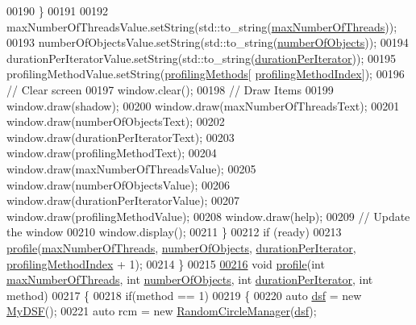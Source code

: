 \begin{DoxyCode}
00190         \}
00191         
00192         maxNumberOfThreadsValue.setString(std::to\_string(\hyperlink{main_8cpp_a4639134a7fa7033334111ff9d77316f3}{maxNumberOfThreads}));
00193         numberOfObjectsValue.setString(std::to\_string(\hyperlink{main_8cpp_a2303e0afaea24a80ed690de888548862}{numberOfObjects}));
00194         durationPerIteratorValue.setString(std::to\_string(\hyperlink{main_8cpp_a05d9b1ebdb968e99b310a90811f1be91}{durationPerIterator}));
00195         profilingMethodValue.setString(\hyperlink{main_8cpp_aaa584e20e5a596003330cdcce055ccf9}{profilingMethods}[
      \hyperlink{main_8cpp_a610d48030bfa1d44ea8b35346a1b4b21}{profilingMethodIndex}]);
00196         \textcolor{comment}{// Clear screen}
00197         window.clear();
00198         \textcolor{comment}{// Draw Items}
00199         window.draw(shadow);
00200         window.draw(maxNumberOfThreadsText);
00201         window.draw(numberOfObjectsText);
00202         window.draw(durationPerIteratorText);
00203         window.draw(profilingMethodText);
00204         window.draw(maxNumberOfThreadsValue);
00205         window.draw(numberOfObjectsValue);
00206         window.draw(durationPerIteratorValue);
00207         window.draw(profilingMethodValue);
00208         window.draw(help);
00209         \textcolor{comment}{// Update the window}
00210         window.display();
00211     \}
00212     \textcolor{keywordflow}{if} (ready)
00213         \hyperlink{main_8cpp_a31968186041d4f1e3533777bcb15719c}{profile}(\hyperlink{main_8cpp_a4639134a7fa7033334111ff9d77316f3}{maxNumberOfThreads}, \hyperlink{main_8cpp_a2303e0afaea24a80ed690de888548862}{numberOfObjects}, 
      \hyperlink{main_8cpp_a05d9b1ebdb968e99b310a90811f1be91}{durationPerIterator}, \hyperlink{main_8cpp_a610d48030bfa1d44ea8b35346a1b4b21}{profilingMethodIndex} + 1);
00214 \}
00215 
\hypertarget{main_8cpp_source_l00216}{}\hyperlink{main_8cpp_a31968186041d4f1e3533777bcb15719c}{00216} \textcolor{keywordtype}{void} \hyperlink{main_8cpp_a31968186041d4f1e3533777bcb15719c}{profile}(\textcolor{keywordtype}{int} \hyperlink{main_8cpp_a4639134a7fa7033334111ff9d77316f3}{maxNumberOfThreads}, \textcolor{keywordtype}{int} 
      \hyperlink{main_8cpp_a2303e0afaea24a80ed690de888548862}{numberOfObjects}, \textcolor{keywordtype}{int} \hyperlink{main_8cpp_a05d9b1ebdb968e99b310a90811f1be91}{durationPerIterator}, \textcolor{keywordtype}{int} method)
00217 \{
00218     \textcolor{keywordflow}{if}(method == 1)
00219     \{
00220         \textcolor{keyword}{auto} \hyperlink{namespacedsf}{dsf} = \textcolor{keyword}{new} \hyperlink{class_my_d_s_f}{MyDSF}();
00221         \textcolor{keyword}{auto} rcm = \textcolor{keyword}{new} \hyperlink{class_random_circle_manager}{RandomCircleManager}(\hyperlink{namespacedsf}{dsf});

\end{DoxyCode}
